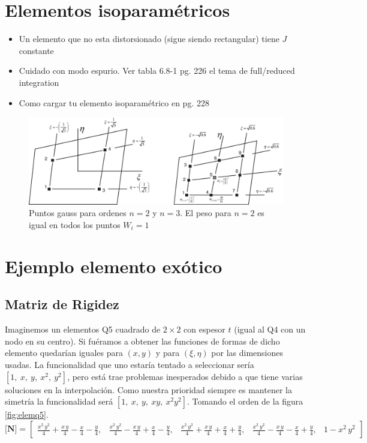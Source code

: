 \documentclass[11pt, a4paper,titlepage]{article}
\newcommand{\Mme}[1]{\boldsymbol{[}\mathbf{#1} \boldsymbol{]}}
\newcommand{\MN}{\Mme{N}}
\begin{document}
\section{Elementos isoparamétricos}
\begin{itemize}
    \item Un elemento que no esta distorsionado (sigue siendo rectangular) tiene $J$ constante
    \item Cuidado con modo espurio. Ver tabla 6.8-1 pg. 226 el tema de full/reduced integration \cite{cook2007concepts}
    \item Como cargar tu elemento isoparamétrico en pg. 228
\end{itemize}

\begin{figure}[htb!]
    \centering
    \includegraphics[width=12cm]{fig/gauss_n3.eps}
    \caption{Puntos gauss para ordenes $n=2$ y $n=3$. El peso para $n=2$ es igual en todos los puntos $W_i=1$}
    \label{fig:gauss_n3}
\end{figure}

\section*{Ejemplo elemento exótico}
\subsection*{Matriz de Rigidez}
Imaginemos un elementos Q5 cuadrado de $2\times2$ con espesor $t$  (igual al Q4 con un nodo en su centro). Si fuéramos a obtener las funciones de formas de dicho elemento quedarían iguales para $(x,y)$ y para $(\xi,\eta)$ por las dimensiones usadas. La funcionalidad que uno estaría tentado a seleccionar sería $[1,\ x, \ y,\ x^2, \ y^2 ]$, pero está trae problemas inesperados debido a que tiene varias soluciones en la interpolación. Como nuestra prioridad siempre es mantener la simetría la funcionalidad será $[1,\ x,\ y,\ xy,\ x^2y^2 ]$.  Tomando el orden de la figura \ref{fig:elemq5}.
\[
\MN=\left[\begin{array}{ccccc} \frac{x^2\,y^2}{4}+\frac{x\,y}{4}-\frac{x}{4}-\frac{y}{4}, & \frac{x^2\,y^2}{4}-\frac{x\,y}{4}+\frac{x}{4}-\frac{y}{4}, & \frac{x^2\,y^2}{4}+\frac{x\,y}{4}+\frac{x}{4}+\frac{y}{4}, & \frac{x^2\,y^2}{4}-\frac{x\,y}{4}-\frac{x}{4}+\frac{y}{4}, & 1-x^2\,y^2 \end{array}\right]
\]
\end{document}
